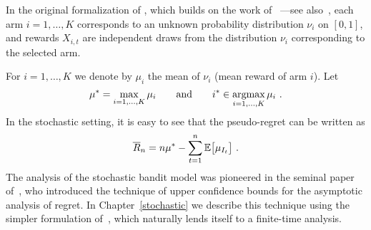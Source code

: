 In the original formalization of \cite{Rob52}, which builds on the work of~\cite{wald1947sequential} ---see also~\cite{arrow1949bayes}, each arm $i=1,\dots,K$ corresponds to an unknown probability distribution $\nu_i$ on $[0,1]$, and rewards $X_{i,t}$ are independent draws from the distribution $\nu_i$ corresponding to the selected arm.
%
\begin{center}
\end{center}
%
For $i=1,\dots,K$ we denote by $\mu_i$ the mean of $\nu_i$ (mean reward of arm $i$).
Let
\[
    \mu^*=\max_{i=1,\hdots,K} \mu_i \qquad\text{and}\qquad i^* \in \mathop{\mathrm{argmax}}_{i=1,\hdots,K} \mu_i~.
\]
In the stochastic setting, it is easy to see that the pseudo-regret can be written as
\begin{equation} \label{eq:pregretstocha}
\overline{R}_n = n \mu^* - \sum_{t=1}^n \mathbb{E}\bigl[\mu_{I_t}\bigr]~.
\end{equation}
The analysis of the stochastic bandit model was pioneered in the seminal paper of~\cite{LR85}, who introduced the technique of upper confidence bounds for the asymptotic analysis of regret. In Chapter~\ref{stochastic} we describe this technique using the simpler formulation of~\cite{Agr95}, which naturally lends itself to a finite-time analysis.

